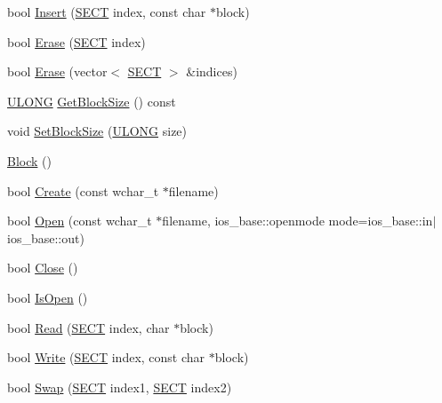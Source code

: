 \begin{DoxyCompactItemize}
\item 
bool \hyperlink{class_y_compound_files_1_1_block_a61c12eddeb5eec41074fec564f439cf5}{Insert} (\hyperlink{_basic_excel_8hpp_a784c2e2144ab372c047faeeb0f6a9e6b}{S\+E\+C\+T} index, const char $\ast$block)
\item 
bool \hyperlink{class_y_compound_files_1_1_block_aee02b7dcfee1954b7e053ef86c24c620}{Erase} (\hyperlink{_basic_excel_8hpp_a784c2e2144ab372c047faeeb0f6a9e6b}{S\+E\+C\+T} index)
\item 
bool \hyperlink{class_y_compound_files_1_1_block_a96743e22bd59a851c9395325e99d1f7b}{Erase} (vector$<$ \hyperlink{_basic_excel_8hpp_a784c2e2144ab372c047faeeb0f6a9e6b}{S\+E\+C\+T} $>$ \&indices)
\item 
\hyperlink{_basic_excel_8hpp_abe09d1bea023be6a07cbadde8e955435}{U\+L\+O\+N\+G} \hyperlink{class_y_compound_files_1_1_block_a234785f132934f9b8737a01efbc88446}{Get\+Block\+Size} () const 
\item 
void \hyperlink{class_y_compound_files_1_1_block_a2aabdba163be99711b67402e75b961f2}{Set\+Block\+Size} (\hyperlink{_basic_excel_8hpp_abe09d1bea023be6a07cbadde8e955435}{U\+L\+O\+N\+G} size)
\item 
\hyperlink{class_y_compound_files_1_1_block_a374eb0f21a455ef899e5ed6e991a428b}{Block} ()
\item 
bool \hyperlink{class_y_compound_files_1_1_block_aee3a1b1e06f4223074a45757c98fe526}{Create} (const wchar\+\_\+t $\ast$filename)
\item 
bool \hyperlink{class_y_compound_files_1_1_block_a70d0b714b2d9702ea4c0bd57f3e8f8c8}{Open} (const wchar\+\_\+t $\ast$filename, ios\+\_\+base\+::openmode mode=ios\+\_\+base\+::in$\vert$ios\+\_\+base\+::out)
\item 
bool \hyperlink{class_y_compound_files_1_1_block_adf23374593e51d1b9d73fbce64016b51}{Close} ()
\item 
bool \hyperlink{class_y_compound_files_1_1_block_ab3cea455bdc27ee87c69ccb9ffda88c9}{Is\+Open} ()
\item 
bool \hyperlink{class_y_compound_files_1_1_block_aa0520832315f65328ef3938c48cc2e86}{Read} (\hyperlink{_basic_excel_8hpp_a784c2e2144ab372c047faeeb0f6a9e6b}{S\+E\+C\+T} index, char $\ast$block)
\item 
bool \hyperlink{class_y_compound_files_1_1_block_a14d4e0c3f598c418f92a7ef69e62f4a2}{Write} (\hyperlink{_basic_excel_8hpp_a784c2e2144ab372c047faeeb0f6a9e6b}{S\+E\+C\+T} index, const char $\ast$block)
\item 
bool \hyperlink{class_y_compound_files_1_1_block_a1f6f350180e78cd2f867058927edcdae}{Swap} (\hyperlink{_basic_excel_8hpp_a784c2e2144ab372c047faeeb0f6a9e6b}{S\+E\+C\+T} index1, \hyperlink{_basic_excel_8hpp_a784c2e2144ab372c047faeeb0f6a9e6b}{S\+E\+C\+T} index2)

\end{DoxyCompactItemize}
